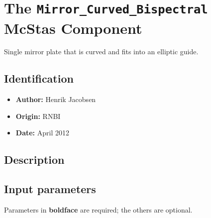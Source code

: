 \section{The \texttt{Mirror\_Curved\_Bispectral} McStas Component}
Single mirror plate that is curved and fits into an elliptic guide.

\subsection*{Identification}
\begin{itemize}
  \item \textbf{Author:} Henrik Jacobsen
  \item \textbf{Origin:} RNBI
  \item \textbf{Date:} April 2012
\end{itemize}

\subsection*{Description}


\subsection*{Input parameters}
Parameters in \textbf{boldface} are required; the others are optional.

